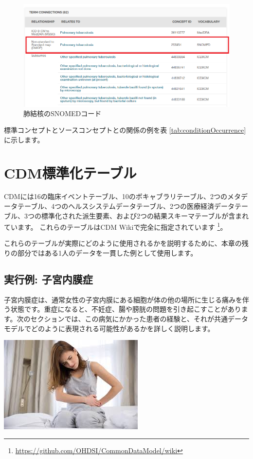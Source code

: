 \documentclass[
  11pt]{book}
\theoremstyle{definition}
\theoremstyle{definition}
\theoremstyle{definition}
\theoremstyle{definition}
\theoremstyle{remark}
\begin{document}
\begin{figure}
\includegraphics[width=1\linewidth]{images/CommonDataModel/pulmTubMap} \caption{肺結核のSNOMEDコード}\label{fig:pulmTubMap}
\end{figure}

標準コンセプトとソースコンセプトとの関係の例を表 \ref{tab:conditionOccurrence}に示します。

\section{CDM標準化テーブル}\label{cdmux6a19ux6e96ux5316ux30c6ux30fcux30d6ux30eb}


CDMには16の臨床イベントテーブル、10のボキャブラリテーブル、2つのメタデータテーブル、4つのヘルスシステムデータテーブル、2つの医療経済データテーブル、3つの標準化された派生要素、および2つの結果スキーマテーブルが含まれています。 これらのテーブルはCDM Wikiで完全に指定されています \footnote{\url{https://github.com/OHDSI/CommonDataModel/wiki}}。

これらのテーブルが実際にどのように使用されるかを説明するために、本章の残りの部分ではある1人のデータを一貫した例として使用します。

\subsection{実行例: 子宮内膜症}\label{ux5b9fux884cux4f8b-ux5b50ux5baeux5185ux819cux75c7}

子宮内膜症は、通常女性の子宮内膜にある細胞が体の他の場所に生じる痛みを伴う状態です。重症になると、不妊症、腸や膀胱の問題を引き起こすことがあります。次のセクションでは、この病気にかかった患者の経験と、それが共通データモデルでどのように表現される可能性があるかを詳しく説明します。

\begin{center}\includegraphics[width=0.5\linewidth]{images/CommonDataModel/Lauren} \end{center}
\end{document}
